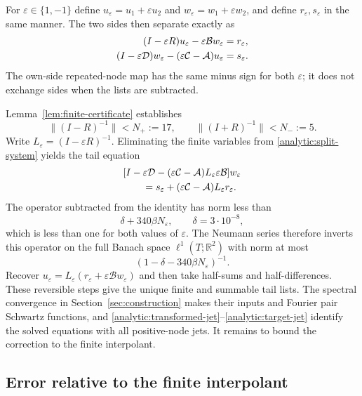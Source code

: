 \documentclass[11pt]{article}
\theoremstyle{remark}\newtheorem{remark}[theorem]{Remark}
\begin{document}
For $\varepsilon\in\{1,-1\}$ define
$u_\varepsilon=u_1+\varepsilon u_2$ and
$w_\varepsilon=w_1+\varepsilon w_2$, and define $r_\varepsilon,s_\varepsilon$
in the same manner. The two sides then separate exactly as
\begin{align}
 (I-\varepsilon R)u_\varepsilon
     -\varepsilon\mathcal B w_\varepsilon&=r_\varepsilon,
 \notag\\
 (I-\varepsilon\mathcal D)w_\varepsilon
       -(\varepsilon\mathcal C-\mathcal A)u_\varepsilon&=s_\varepsilon.
 \label{analytic:split-system}
\end{align}
The own-side repeated-node map has the same minus sign for both
$\varepsilon$; it does not exchange sides when the lists are subtracted.

Lemma~\ref{lem:finite-certificate} establishes
\[
 \|(I-R)^{-1}\|<N_+:=17,\qquad
 \|(I+R)^{-1}\|<N_-:=5.
\]
Write $L_\varepsilon=(I-\varepsilon R)^{-1}$.
Eliminating the finite variables from
\eqref{analytic:split-system} yields the tail equation
\begin{align}
 &[I-\varepsilon\mathcal D
  -(\varepsilon\mathcal C-\mathcal A)L_\varepsilon
                                      \varepsilon\mathcal B]
       w_\varepsilon\notag\\
 &\hspace{2em}=s_\varepsilon+
           (\varepsilon\mathcal C-\mathcal A)L_\varepsilon r_\varepsilon.
 \label{analytic:schur-tail}
\end{align}
The operator subtracted from the identity has norm less than
\[
 \delta+340\beta N_\varepsilon,
 \qquad \delta=3\cdot10^{-8},
\]
which is less than one for both values of $\varepsilon$.
The Neumann series therefore inverts this operator on the full
Banach space $\ell^1(T;\mathbb R^2)$ with norm at most
\begin{equation}
 (1-\delta-340\beta N_\varepsilon)^{-1}.
 \label{analytic:tail-inverse-bound}
\end{equation}
Recover
$u_\varepsilon=L_\varepsilon(r_\varepsilon+
\varepsilon\mathcal B w_\varepsilon)$ and then take half-sums and
half-differences. These reversible steps give the unique finite and
summable tail lists. The spectral convergence in
Section~\ref{sec:construction} makes their inputs and Fourier pair
Schwartz functions, and
\eqref{analytic:transformed-jet}--\eqref{analytic:target-jet} identify
the solved equations with all positive-node jets. It remains to bound
the correction to the finite interpolant.

\subsection{Error relative to the finite interpolant}
\end{document}
